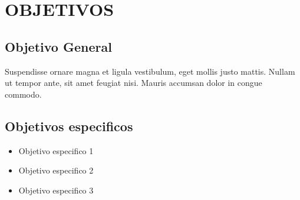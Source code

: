 \chapter{OBJETIVOS}

\section{Objetivo General}
Suspendisse ornare magna et ligula vestibulum, eget mollis justo mattis. Nullam ut tempor ante, sit amet feugiat nisi. Mauris accumsan dolor in congue commodo.

\section{Objetivos especificos}
\begin{itemize}
    \item Objetivo especifico 1
    \item Objetivo especifico 2
    \item Objetivo especifico 3
\end{itemize}

